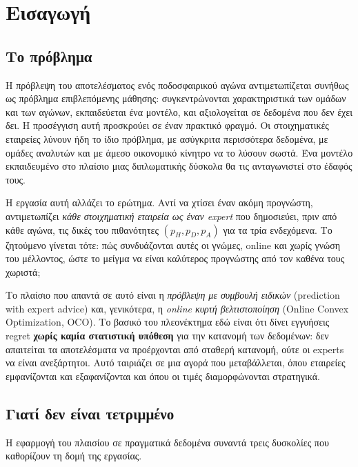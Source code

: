 \documentclass[12pt,a4paper,oneside]{report}
\newcommand{\en}[1]{\textenglish{#1}}
\renewcommand{\_}{\oldunderscore\allowbreak}
\theoremstyle{definition}
\theoremstyle{plain}
\theoremstyle{remark}
\begin{document}
\cleardoublepage
\tableofcontents
\cleardoublepage

\chapter{Εισαγωγή}

\section{Το πρόβλημα}

Η πρόβλεψη του αποτελέσματος ενός ποδοσφαιρικού αγώνα αντιμετωπίζεται συνήθως ως πρόβλημα
επιβλεπόμενης μάθησης: συγκεντρώνονται χαρακτηριστικά των ομάδων και των αγώνων,
εκπαιδεύεται ένα μοντέλο, και αξιολογείται σε δεδομένα που δεν έχει δει. Η προσέγγιση αυτή
προσκρούει σε έναν πρακτικό φραγμό. Οι στοιχηματικές εταιρείες λύνουν ήδη το ίδιο πρόβλημα,
με ασύγκριτα περισσότερα δεδομένα, με ομάδες αναλυτών και με άμεσο οικονομικό κίνητρο να το
λύσουν σωστά. Ένα μοντέλο εκπαιδευμένο στο πλαίσιο μιας διπλωματικής δύσκολα θα τις
ανταγωνιστεί στο έδαφός τους.

Η εργασία αυτή αλλάζει το ερώτημα. Αντί να χτίσει έναν ακόμη προγνώστη, αντιμετωπίζει
\emph{κάθε στοιχηματική εταιρεία ως έναν expert} που δημοσιεύει, πριν από κάθε αγώνα, τις
δικές του πιθανότητες $(p_H, p_D, p_A)$ για τα τρία ενδεχόμενα. Το ζητούμενο γίνεται τότε:
πώς συνδυάζονται αυτές οι γνώμες, online και χωρίς γνώση του μέλλοντος, ώστε το μείγμα να
είναι καλύτερος προγνώστης από τον καθένα τους χωριστά;

Το πλαίσιο που απαντά σε αυτό είναι η \emph{πρόβλεψη με συμβουλή ειδικών} (\en{prediction
with expert advice}) και, γενικότερα, η \emph{online κυρτή βελτιστοποίηση} (\en{Online
Convex Optimization}, OCO). Το βασικό του πλεονέκτημα εδώ είναι ότι δίνει εγγυήσεις regret
\textbf{χωρίς καμία στατιστική υπόθεση} για την κατανομή των δεδομένων: δεν απαιτείται τα
αποτελέσματα να προέρχονται από σταθερή κατανομή, ούτε οι experts να είναι ανεξάρτητοι.
Αυτό ταιριάζει σε μια αγορά που μεταβάλλεται, όπου εταιρείες εμφανίζονται και εξαφανίζονται
και όπου οι τιμές διαμορφώνονται στρατηγικά.

\section{Γιατί δεν είναι τετριμμένο}

Η εφαρμογή του πλαισίου σε πραγματικά δεδομένα συναντά τρεις δυσκολίες που καθορίζουν τη
δομή της εργασίας.
\end{document}
